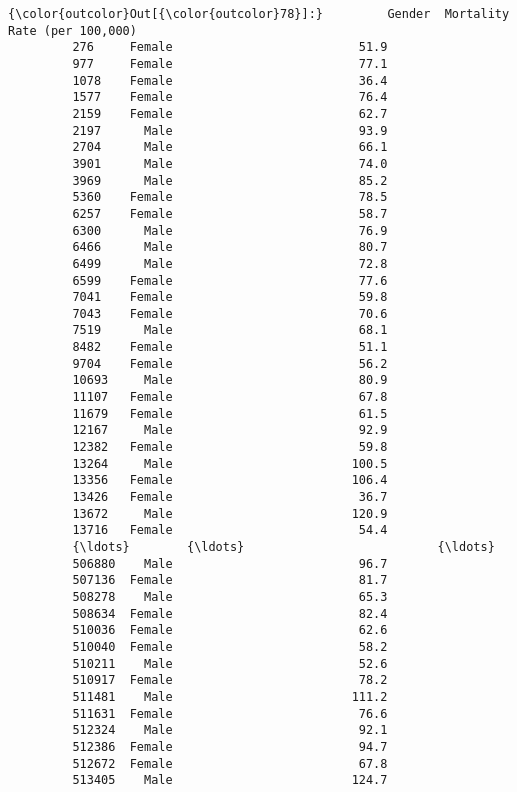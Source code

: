 \documentclass[11pt]{article}
\begin{document}
\begin{Verbatim}[commandchars=\\\{\}]
{\color{outcolor}Out[{\color{outcolor}78}]:}         Gender  Mortality Rate (per 100,000)
         276     Female                          51.9
         977     Female                          77.1
         1078    Female                          36.4
         1577    Female                          76.4
         2159    Female                          62.7
         2197      Male                          93.9
         2704      Male                          66.1
         3901      Male                          74.0
         3969      Male                          85.2
         5360    Female                          78.5
         6257    Female                          58.7
         6300      Male                          76.9
         6466      Male                          80.7
         6499      Male                          72.8
         6599    Female                          77.6
         7041    Female                          59.8
         7043    Female                          70.6
         7519      Male                          68.1
         8482    Female                          51.1
         9704    Female                          56.2
         10693     Male                          80.9
         11107   Female                          67.8
         11679   Female                          61.5
         12167     Male                          92.9
         12382   Female                          59.8
         13264     Male                         100.5
         13356   Female                         106.4
         13426   Female                          36.7
         13672     Male                         120.9
         13716   Female                          54.4
         {\ldots}        {\ldots}                           {\ldots}
         506880    Male                          96.7
         507136  Female                          81.7
         508278    Male                          65.3
         508634  Female                          82.4
         510036  Female                          62.6
         510040  Female                          58.2
         510211    Male                          52.6
         510917  Female                          78.2
         511481    Male                         111.2
         511631  Female                          76.6
         512324    Male                          92.1
         512386  Female                          94.7
         512672  Female                          67.8
         513405    Male                         124.7

\end{Verbatim}
\end{document}
